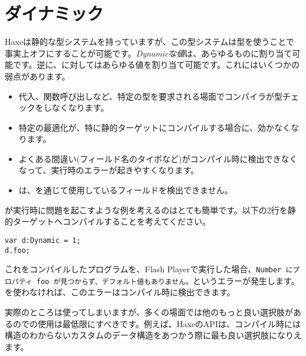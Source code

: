 \section{ダイナミック}
\label{types-dynamic}

Haxeは静的な型システムを持っていますが、この型システムは型を使うことで事実上オフにすることが可能です。\emph{Dynamicな値}は、あらゆるものに割り当て可能です。逆に、に対してはあらゆる値を割り当て可能です。これにはいくつかの弱点があります。

\begin{itemize}
	\item 代入、関数呼び出しなど、特定の型を要求される場面でコンパイラが型チェックをしなくなります。
	\item 特定の最適化が、特に静的ターゲットにコンパイルする場合に、効かなくなります。
	\item よくある間違い(フィールド名のタイポなど)がコンパイル時に検出できなくなって、実行時のエラーが起きやすくなります。
	\item {}は、を通じて使用しているフィールドを検出できません。
\end{itemize}

が実行時に問題を起こすような例を考えるのはとても簡単です。以下の2行を静的ターゲットへコンパイルすることを考えてください。

\begin{lstlisting}
var d:Dynamic = 1;
d.foo;
\end{lstlisting}

これをコンパイルしたプログラムを、Flash Playerで実行した場合、\texttt{Number にプロパティ foo が見つからず、デフォルト値もありません。}というエラーが発生します。を使わなければ、このエラーはコンパイル時に検出できます。


実際のところは使ってしまいますが、多くの場面では他のもっと良い選択肢があるのでの使用は最低限にすべきです。例えば、HaxeのAPIは、コンパイル時には構造のわからないカスタムのデータ構造をあつかう際に最も良い選択肢になりえます。

